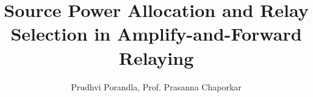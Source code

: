 \documentclass{absconf}
\begin{document}
\begin{frontmatter}

\title{Source Power Allocation and Relay Selection in Amplify-and-Forward Relaying}

\author{Prudhvi Porandla, Prof. Prasanna Chaporkar} 
\address{ Electrical Engineering, IIT Bombay   }
	\vspace{12pt}
\begin{abstract}                %
	\mbox{} \\ 
	
\end{abstract}

\begin{keyword}
\end{keyword}

\end{frontmatter}
\end{document}
